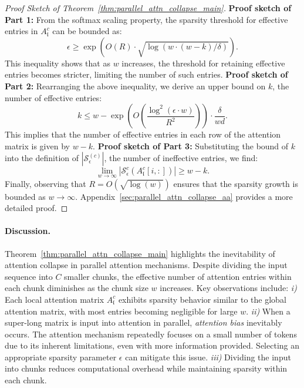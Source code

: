 \begin{proof}[Proof Sketch of Theorem~\ref{thm:parallel_attn_collapse_main}]
{\bf Proof sketch of Part 1:} From the softmax scaling property, the sparsity threshold for effective entries in \( A^{c}_\mathfrak{l} \) can be bounded as:
\[
\epsilon \geq \exp\left(O(R) \cdot \sqrt{\log(w \cdot (w-k)/\delta)}\right).
\]
This inequality shows that as \( w \) increases, the threshold for retaining effective entries becomes stricter, limiting the number of such entries. {\bf Proof sketch of Part 2:} Rearranging the above inequality, we derive an upper bound on \( k \), the number of effective entries:
\[
k \leq w - \exp\left(O\left(\frac{\log^2(\epsilon \cdot w)}{R^2}\right)\right) \cdot \frac{\delta}{wd}.
\]
This implies that the number of effective entries in each row of the attention matrix is given by \( w - k \). {\bf Proof sketch of Part 3:} Substituting the bound of \( k \) into the definition of \( |\mathcal{S}_\epsilon^{(c)}| \), the number of ineffective entries, we find:
\[
\lim_{w \to \infty} | \mathcal{S}_\epsilon^{c}(A_\mathfrak{l}^{c}[i,:]) | \geq w - k.
\]
Finally, observing that \( R = O(\sqrt{\log(w)}) \) ensures that the sparsity growth is bounded as \( w \to \infty \). Appendix~\ref{sec:parallel_attn_collapse_aa} provides a more detailed proof.
\end{proof} 


\vspace{-6mm}
\paragraph{Discussion.}

Theorem~\ref{thm:parallel_attn_collapse_main} highlights the inevitability of attention collapse in parallel attention mechanisms. Despite dividing the input sequence into \( C \) smaller chunks, the effective number of attention entries within each chunk diminishes as the chunk size \( w \) increases. Key observations include: \textit{i)} Each local attention matrix \( A^{c}_\mathfrak{l} \) exhibits sparsity behavior similar to the global attention matrix, with most entries becoming negligible for large \( w \). \textit{ii)} When a super-long matrix is input into attention in parallel, {\it attention bias} inevitably occurs. The attention mechanism repeatedly focuses on a small number of tokens due to its inherent limitations, even with more information provided. Selecting an appropriate sparsity parameter \( \epsilon \) can mitigate this issue. \textit{iii)} Dividing the input into chunks reduces computational overhead while maintaining sparsity within each chunk.


